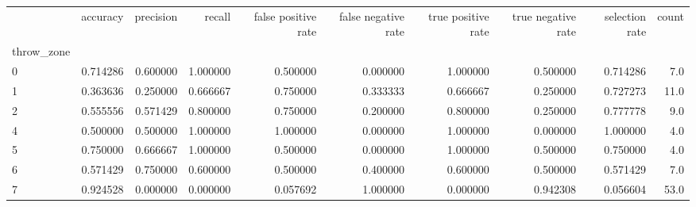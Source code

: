 \begin{tabular}{lrrrrrrrrr}
\toprule
{} &  accuracy &  precision &    recall &  false positive rate &  false negative rate &  true positive rate &  true negative rate &  selection rate &  count \\
throw\_zone &           &            &           &                      &                      &                     &                     &                 &        \\
\midrule
0          &  0.714286 &   0.600000 &  1.000000 &             0.500000 &             0.000000 &            1.000000 &            0.500000 &        0.714286 &    7.0 \\
1          &  0.363636 &   0.250000 &  0.666667 &             0.750000 &             0.333333 &            0.666667 &            0.250000 &        0.727273 &   11.0 \\
2          &  0.555556 &   0.571429 &  0.800000 &             0.750000 &             0.200000 &            0.800000 &            0.250000 &        0.777778 &    9.0 \\
4          &  0.500000 &   0.500000 &  1.000000 &             1.000000 &             0.000000 &            1.000000 &            0.000000 &        1.000000 &    4.0 \\
5          &  0.750000 &   0.666667 &  1.000000 &             0.500000 &             0.000000 &            1.000000 &            0.500000 &        0.750000 &    4.0 \\
6          &  0.571429 &   0.750000 &  0.600000 &             0.500000 &             0.400000 &            0.600000 &            0.500000 &        0.571429 &    7.0 \\
7          &  0.924528 &   0.000000 &  0.000000 &             0.057692 &             1.000000 &            0.000000 &            0.942308 &        0.056604 &   53.0 \\
\bottomrule
\end{tabular}
